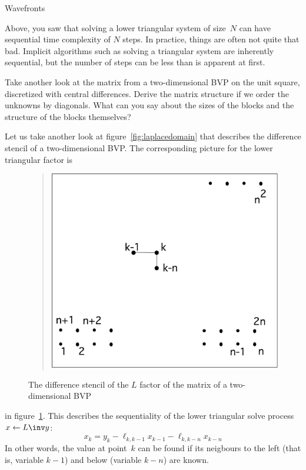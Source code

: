  {Wavefronts}
\label{sec:wavefront}

Above, you saw that solving a lower triangular system of size~$N$ can
have sequential time complexity of $N$ steps. In practice, things are
often not quite that bad. Implicit algorithms such as solving a
triangular system are inherently sequential, but the number of 
steps can be less than is apparent at first.

\begin{exercise}
  Take another look at the matrix from a two-dimensional \ac{BVP} on
  the unit square,
  discretized with central differences.
  Derive the matrix structure if we
  order the unknowns by diagonals. What can you say about the sizes of
  the blocks and the structure of the blocks themselves?
\end{exercise}

Let us take another look at
figure~\ref{fig:laplacedomain} that describes the difference stencil
of a two-dimensional \ac{BVP}. The corresponding picture for the lower
triangular factor is
\begin{figure}
  \begin{quote}
    \includegraphics[scale=.12]{graphics-public/laplacelower}
  \end{quote}
  \caption{The difference stencil of the $L$ factor of the matrix
    of a two-dimensional \ac{BVP}}
  \label{fig:laplacelower}
\end{figure}
in figure~\ref{fig:laplacelower}. This describes the sequentiality of
the lower triangular solve process $x\leftarrow L\inv y$:
\[ x_k = y_k - \ell_{k,k-1}x_{k-1} - \ell_{k,k-n}x_{k-n} \]
In other words, the value at point~$k$ can be found if its neigbours
to the left (that is, variable $k-1$) and below (variable $k-n$) are
known. 

